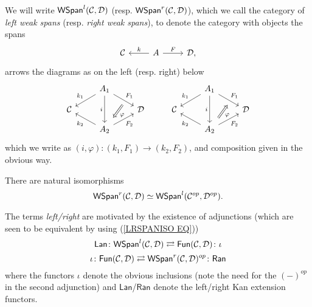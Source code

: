 \documentclass[a4paper,10pt]{article}%
\begin{document}
\begin{definition}\label{WSPAN DEF}
  We will write 
  $\mathsf{WSpan}^l(\mathcal{C},\mathcal{D})$
  (resp.
  $\mathsf{WSpan}^r(\mathcal{C},\mathcal{D})$),
  which we call the category of  \textit{left weak spans} (resp. \textit{right weak spans}),
  to denote the category with objects the spans
  \[
  \begin{tikzcd}
    \C & A \ar{l}[swap]{k} \ar{r}{F} & \D,
  \end{tikzcd}
  \]
  arrows the diagrams as on the left (resp. right) below \begin{equation}\label{TWISTEDARROWRIGHT EQ}
    \begin{tikzcd}[row sep=small]
      &
      A_1 \ar{dl}[swap,name=k1]{k_1} \ar{dr}[name=F11]{F_1} \ar{dd}[swap]{i} & &
      &
      A_1 \ar{dl}[swap,name=k1]{k_1} \ar{dr}[name=F1]{F_1} \ar{dd}[swap]{i} 
      \\
      \C & & \D &
      \C & & \D 
      \\
      & |[alias=G21]| A_2  \ar{ul}{k_2} \ar{ur}[swap]{F_2} & &
      & |[alias=G2]| A_2  \ar{ul}{k_2} \ar{ur}[swap]{F_2} &
      \arrow[Leftarrow, from=F1, to=G2,shorten >=0.25cm,shorten <=0.25cm,"\varphi"]
      \arrow[Rightarrow, from=F11, to=G21,shorten >=0.25cm,shorten <=0.25cm,"\varphi"]
    \end{tikzcd}
  \end{equation}
  which we write as $(i,\varphi) \colon (k_1,F_1) \to (k_2,F_2)$, and composition given in the obvious way.
\end{definition}


\begin{remark}
  There are natural isomorphisms
  \begin{equation}\label{LRSPANISO EQ}
    \mathsf{WSpan}^r(\mathcal{C},\mathcal{D}) \simeq \mathsf{WSpan}^l(\mathcal{C}^{op},\mathcal{D}^{op}).
  \end{equation}
\end{remark}


\begin{remark}\label{RANLANADJ REM}
  The terms \textit{left/right} are motivated by the existence of adjunctions (which are seen to be equivalent by using (\ref{LRSPANISO EQ}))
  \[
  \mathsf{Lan} \colon
  \mathsf{WSpan}^l(\mathcal{C}, \mathcal{D})
  \rightleftarrows
  \mathsf{Fun}(\mathcal{C}, \mathcal{D})
  \colon \iota
  \]
  \[
  \iota \colon 
  \mathsf{Fun}(\mathcal{C}, \mathcal{D})
  \rightleftarrows
  \mathsf{WSpan}^r(\mathcal{C}, \mathcal{D})^{op}
  \colon \mathsf{Ran}
  \]
  where the functors $\iota$ denote the obvious inclusions 
  (note the need for the $(\minus)^{op}$ in the second adjunction) 
  and $\mathsf{Lan}$/$\mathsf{Ran}$ denote the left/right Kan extension functors.
\end{remark}
\end{document}
